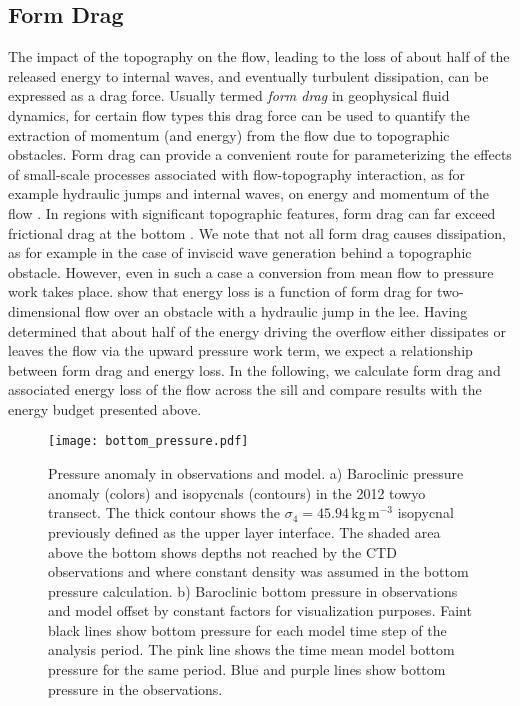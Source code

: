 \documentclass{ametsocV6.1}
\begin{document}
\subsection{Form Drag}
\label{ssec:FormDrag}
The impact of the topography on the flow, leading to the loss of about half of the released energy to internal waves, and eventually turbulent dissipation, can be expressed as a drag force.
Usually termed \emph{form drag} in geophysical fluid dynamics, for certain flow types this drag force can be used to quantify the extraction of momentum (and energy) from the flow due to topographic obstacles.
Form drag can provide a convenient route for parameterizing the effects of small-scale processes associated with flow-topography interaction, as for example hydraulic jumps and internal waves, on energy and momentum of the flow \citep[e.g.][]{klymaketal10a, maccreadyetal03, warneretal13}.
In regions with significant topographic features, form drag can far exceed frictional drag at the bottom \citep[e.g.][]{moumnash00, edwardsetal04, mccabeetal06, warneretal13}.
We note that not all form drag causes dissipation, as for example in the case of inviscid wave generation behind a topographic obstacle.
However, even in such a case a conversion from mean flow to pressure work takes place.
\citet[][p.~72]{prattwhitehead07} show that energy loss is a function of form drag for two-dimensional flow over an obstacle with a hydraulic jump in the lee.
Having determined that about half of the energy driving the overflow either dissipates or leaves the flow via the upward pressure work term, we expect a relationship between form drag and energy loss. 
In the following, we calculate form drag and associated energy loss of the flow across the sill and compare results with the energy budget presented above.

\begin{figure*}
\centerline{\texttt{[image: bottom\_pressure.pdf]}}
\caption{Pressure anomaly in observations and model.
a) Baroclinic pressure anomaly (colors) and isopycnals (contours) in the 2012 towyo transect.
The thick contour shows the $\sigma_4=45.94$\,kg\,m$^{-3}$ isopycnal previously defined as the upper layer interface.
The shaded area above the bottom shows depths not reached by the CTD observations and where constant density was assumed in the bottom pressure calculation.
b) Baroclinic bottom pressure in observations and model offset by constant factors for visualization purposes.
Faint black lines show bottom pressure for each model time step of the analysis period.
The pink line shows the time mean model bottom pressure for the same period.
Blue and purple lines show bottom pressure in the observations. 
}
\label{fig:BottomPressure}
\end{figure*}
\end{document}
